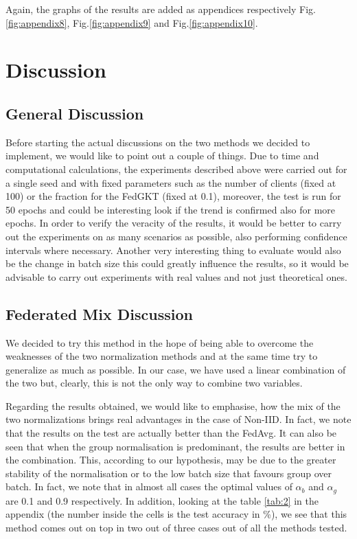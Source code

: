 \documentclass[conference]{IEEEtran}
\begin{document}
Again, the graphs of the results are added as appendices respectively Fig.\ref{fig:appendix8}, Fig.\ref{fig:appendix9} and Fig.\ref{fig:appendix10}.

\section{Discussion}

\subsection{General Discussion}
Before starting the actual discussions on the two methods we decided to implement, we would like to point out a couple of things. Due to time and computational calculations, the experiments described above were carried out for a single seed and with fixed parameters such as the number of clients (fixed at 100) or the fraction for the FedGKT (fixed at 0.1), moreover, the test is run for 50 epochs and could be interesting look if the trend is confirmed also for more epochs. In order to verify the veracity of the results, it would be better to carry out the experiments on as many scenarios as possible, also performing confidence intervals where necessary. Another very interesting thing to evaluate would also be the change in batch size this could greatly influence the results, so it would be advisable to carry out experiments with real values and not just theoretical ones.

\subsection{Federated Mix Discussion}
We decided to try this method in the hope of being able to overcome the weaknesses of the two normalization methods and at the same time try to generalize as much as possible. In our case, we have used a linear combination of the two but, clearly, this is not the only way to combine two variables. 

Regarding the results obtained, we would like to emphasise, how the mix of the two normalizations brings real advantages in the case of Non-IID. In fact, we note that the results on the test are actually better than the FedAvg. It can also be seen that when the group normalisation is predominant, the results are better in the combination. This, according to our hypothesis, may be due to the greater stability of the normalisation or to the low batch size that favours group over batch. In fact, we note that in almost all cases the optimal values of $\alpha_b$ and $\alpha_g$ are 0.1 and 0.9 respectively. In addition, looking at the table \ref{tab:2} in the appendix (the number inside the cells is the test accuracy in \%), we see that this method comes out on top in two out of three cases out of all the methods tested. 
\end{document}
